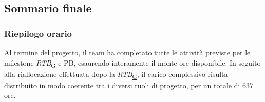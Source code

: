 \documentclass[a4paper,12pt]{article}
\begin{document}
\subsection{Sommario finale}
    \subsubsection{Riepilogo orario}{
        Al termine del progetto, il team ha completato tutte le attività previste per le milestone \textit{RTB}\textsubscript{\href{https://atlasteam9.github.io/Atlas/glossario.html\#RTB}{G}} e PB, esaurendo interamente il monte ore disponibile. In seguito alla riallocazione effettuata dopo la \textit{RTB}\textsubscript{\href{https://atlasteam9.github.io/Atlas/glossario.html\#RTB}{G}}, il carico complessivo risulta distribuito in modo coerente tra i diversi ruoli di progetto, per un totale di 637 ore.

        \begin{table}[H]
                \centering
                \hspace*{-14cm}%



\end{table}}
\end{document}
